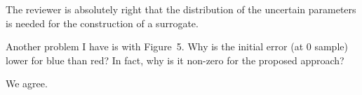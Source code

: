 \begin{authors}
The reviewer is absolutely right that the distribution of the uncertain
parameters is needed for the construction of a surrogate.

\begin{actions}
\end{actions}
\end{authors}

\begin{reviewer}
Another problem I have is with Figure~5. Why is the initial error (at 0 sample)
lower for blue than red? In fact, why is it non-zero for the proposed approach?
\end{reviewer}

\begin{authors}
We agree.

\begin{actions}
\end{actions}
\end{authors}
